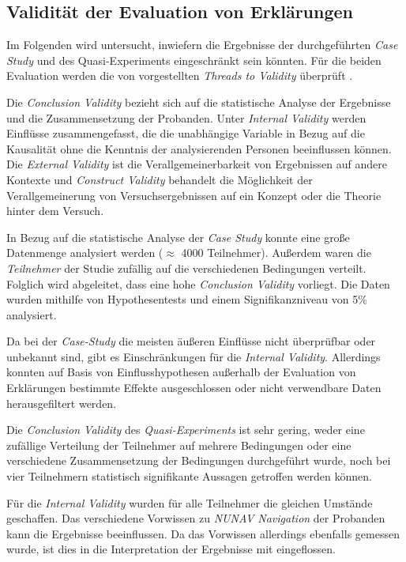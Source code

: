 \subsection{Validität der Evaluation von Erklärungen}

Im Folgenden wird untersucht, inwiefern die Ergebnisse der durchgeführten \textit{Case Study} und des Quasi-Experiments eingeschränkt sein könnten. Für die beiden Evaluation werden die von \citeauthor{wohlin2012experimentation} vorgestellten \textit{Threads to Validity} überprüft \cite{wohlin2012experimentation}.

Die \textit{Conclusion Validity} bezieht sich auf die statistische Analyse der Ergebnisse und die Zusammensetzung der Probanden. Unter \textit{Internal Validity} werden Einflüsse zusammengefasst, die die unabhängige Variable in Bezug auf die Kausalität ohne die Kenntnis der analysierenden Personen beeinflussen können. Die \textit{External Validity} ist die Verallgemeinerbarkeit von Ergebnissen auf andere Kontexte und \textit{Construct Validity} behandelt die Möglichkeit der Verallgemeinerung von Versuchsergebnissen auf ein Konzept oder die Theorie hinter dem Versuch.

In Bezug auf die statistische Analyse der \textit{Case Study} konnte eine große Datenmenge analysiert werden ($\approx$ 4000 Teilnehmer). Außerdem waren die \textit{Teilnehmer} der Studie zufällig auf die verschiedenen Bedingungen verteilt. Folglich wird abgeleitet, dass eine hohe \textit{Conclusion Validity} vorliegt. Die Daten wurden mithilfe von Hypothesentests und einem Signifikanzniveau von 5\% analysiert.

Da bei der \textit{Case-Study} die meisten äußeren Einflüsse nicht überprüfbar oder unbekannt sind, gibt es Einschränkungen für die \textit{Internal Validity}. Allerdings konnten auf Basis von Einflusshypothesen außerhalb der Evaluation von Erklärungen bestimmte Effekte ausgeschlossen oder nicht verwendbare Daten herausgefiltert werden.

\smallskip

Die \textit{Conclusion Validity} des \textit{Quasi-Experiments} ist sehr gering, weder eine zufällige Verteilung der Teilnehmer auf mehrere Bedingungen oder eine verschiedene Zusammensetzung der Bedingungen durchgeführt wurde, noch bei vier Teilnehmern statistisch signifikante Aussagen getroffen werden können.

Für die \textit{Internal Validity} wurden für alle Teilnehmer die gleichen Umstände geschaffen. Das verschiedene Vorwissen zu \textit{NUNAV Navigation} der Probanden kann die Ergebnisse beeinflussen. Da das Vorwissen allerdings ebenfalls gemessen wurde, ist dies in die Interpretation der Ergebnisse mit eingeflossen.

